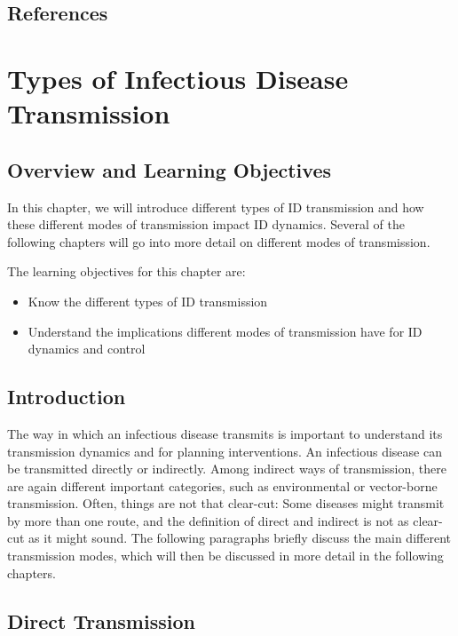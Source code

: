 \documentclass[]{article}
\providecommand{\tightlist}{%
  \setlength{\itemsep}{0pt}\setlength{\parskip}{0pt}}
\theoremstyle{definition}
\theoremstyle{definition}
\theoremstyle{definition}
\theoremstyle{remark}
\begin{document}
\subsection{References}\label{references-4}

\section{Types of Infectious Disease
Transmission}\label{types-of-infectious-disease-transmission}

\subsection{Overview and Learning
Objectives}\label{overview-and-learning-objectives-4}

In this chapter, we will introduce different types of ID transmission
and how these different modes of transmission impact ID dynamics.
Several of the following chapters will go into more detail on different
modes of transmission.

The learning objectives for this chapter are:

\begin{itemize}
\tightlist
\item
  Know the different types of ID transmission
\item
  Understand the implications different modes of transmission have for
  ID dynamics and control
\end{itemize}

\subsection{Introduction}\label{introduction-4}

The way in which an infectious disease transmits is important to
understand its transmission dynamics and for planning interventions. An
infectious disease can be transmitted directly or indirectly. Among
indirect ways of transmission, there are again different important
categories, such as environmental or vector-borne transmission. Often,
things are not that clear-cut: Some diseases might transmit by more than
one route, and the definition of direct and indirect is not as clear-cut
as it might sound. The following paragraphs briefly discuss the main
different transmission modes, which will then be discussed in more
detail in the following chapters.

\subsection{Direct Transmission}\label{direct-transmission}
\end{document}
